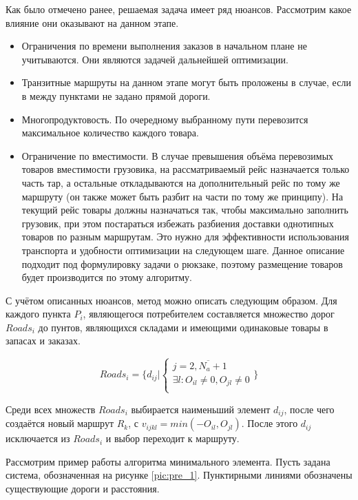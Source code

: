 	Как было отмечено ранее, решаемая задача имеет ряд нюансов. Рассмотрим какое влияние они оказывают на данном этапе.
	\begin{itemize}
		\item Ограничения по времени выполнения заказов в начальном плане не учитываются. Они являются задачей дальнейшей оптимизации.
		\item Транзитные маршруты на данном этапе могут быть проложены в случае, если в между пунктами не задано прямой дороги.
		\item Многопродуктовость\cite{trans:polyprod}. По очередному выбранному пути перевозится максимальное количество каждого товара. 
		\item Ограничение по вместимости. В случае превышения объёма перевозимых товаров вместимости грузовика, на рассматриваемый рейс назначается только часть тар, а остальные откладываются на дополнительный рейс по тому же маршруту (он также может быть разбит на части по тому же принципу). На текущий рейс товары должны назначаться так, чтобы максимально заполнить грузовик, при этом постараться избежать разбиения доставки однотипных товаров по разным маршрутам. Это нужно для эффективности использования транспорта и удобности оптимизации на следующем шаге. Данное описание подходит под формулировку задачи о рюкзаке\cite{alg:Skiena}, поэтому размещение товаров будет производится по этому алгоритму.
	\end{itemize}
	
	С учётом описанных нюансов, метод можно описать следующим образом. Для каждого пункта $P_i$, являющегося потребителем составляется множество дорог $Roads_i$ до пунтов, являющихся складами и имеющими одинаковые товары в запасах и заказах.
	
	\begin{equation}
		\label{roads}
		Roads_i = \{
			d_{ij} 
			| 
			\left\{ \begin{array}{ccc}	
				j = \overline{2, N_a + 1} \\
				\exists l: O_{il} \ne 0, O_{jl} \ne 0\\
			\end{array}	\right.
		\}
	\end{equation}

	Среди всех множеств $Roads_i$ выбирается наименьший элемент $d_{ij}$, после чего создаётся новый маршрут $R_k$, с $v_{ijkl} = min(-O_{il}, O_{jl})$. После этого $d_{ij}$ исключается из $Roads_i$ и выбор переходит к маршруту.
	
	Рассмотрим пример работы алгоритма минимального элемента. Пусть задана система, обозначенная на рисунке \ref{pic:pre_1}. Пунктирными линиями обозначены существующие дороги и расстояния.
	
